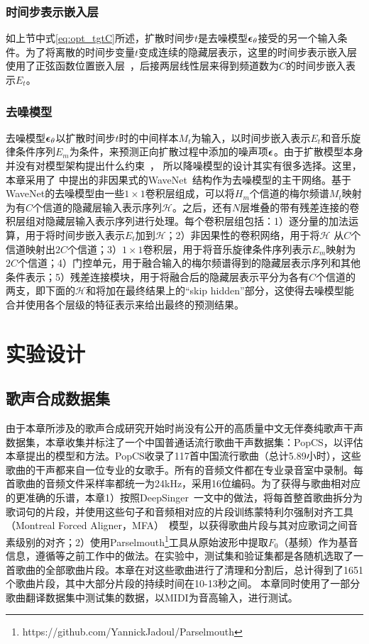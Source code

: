 \subsubsection{时间步表示嵌入层}
如上节中式\eqref{eq:opt_tgtC}所述，扩散时间步$t$是去噪模型${\boldsymbol{\epsilon}}_\theta$接受的另一个输入条件。为了将离散的时间步变量$t$变成连续的隐藏层表示，这里的时间步表示嵌入层使用了正弦函数位置嵌入层~\citep{vaswani2017attention}，后接两层线性层来得到频道数为$C$的时间步嵌入表示$E_t$。
\subsubsection{去噪模型}
去噪模型${\boldsymbol{\epsilon}}_\theta$以扩散时间步$t$时的中间样本$M_t$为输入，以时间步嵌入表示$E_t$和音乐旋律条件序列$E_m$为条件，来预测正向扩散过程中添加的噪声项${\boldsymbol{\epsilon}}$。由于扩散模型本身并没有对模型架构提出什么约束~\citep{sohl2015deep,kong2021diffwave}， 所以降噪模型的设计其实有很多选择。这里，
本章采用了\citet{rethage2018wavenet,kong2021diffwave}
中提出的非因果式的WaveNet~\citep{vanwavenet}结构作为去噪模型的主干网络。基于WaveNet的去噪模型由一些$1\times1$卷积层组成，可以将$H_m$个信道的梅尔频谱$M_t$映射为有$C$个信道的隐藏层输入表示序列$\mathcal{H}$。之后，还有$N$层堆叠的带有残差连接的卷积层组对隐藏层输入表示序列进行处理。每个卷积层组包括：1）逐分量的加法运算，用于将时间步嵌入表示$E_t$加到$\mathcal{H}$；2）非因果性的卷积网络，用于将$\mathcal{H}$ 从$C$个信道映射出$2C$个信道；3）$1\times1$卷积层，用于将音乐旋律条件序列表示$E_m$映射为$2C$个信道；4）门控单元，用于融合输入的梅尔频谱得到的隐藏层表示序列和其他条件表示；5）残差连接模块，用于将融合后的隐藏层表示平分为各有$C$个信道的两支，即下面的$\mathcal{H}$和将加在最终结果上的``skip hidden''部分，这使得去噪模型能合并使用各个层级的特征表示来给出最终的预测结果。
\section{实验设计}
\subsection{歌声合成数据集}
由于本章所涉及的歌声合成研究开始时尚没有公开的高质量中文无伴奏纯歌声干声数据集，本章收集并标注了一个中国普通话流行歌曲干声数据集：PopCS，以评估本章提出的模型和方法。PopCS收录了117首中国流行歌曲（总计5.89小时），这些歌曲的干声都来自一位专业的女歌手。所有的音频文件都在专业录音室中录制。每首歌曲的音频文件采样率都统一为24kHz，采用16位编码。为了获得与歌曲相对应的更准确的乐谱，本章1）按照DeepSinger~\citep{ren2020deepsinger}一文中的做法，将每首整首歌曲拆分为歌词句的片段，并使用这些句子和音频相对应的片段训练蒙特利尔强制对齐工具（Montreal Forced Aligner，MFA）~\citep{mcauliffe2017montreal}模型，以获得歌曲片段与其对应歌词之间音素级别的对齐；2）使用Parselmouth\footnote{https://github.com/YannickJadoul/Parselmouth}工具从原始波形中提取$F_0$（基频）作为基音信息，遵循\citet{wu2020adversarially,blaauw2020sequence,ren2020deepsinger}等之前工作中的做法。在实验中，测试集和验证集都是各随机选取了一首歌曲的全部歌曲片段。本章在对这些歌曲进行了清理和分割后，总计得到了1651个歌曲片段，其中大部分片段的持续时间在10-13秒之间。
本章同时使用了一部分歌曲翻译数据集中测试集的数据，以MIDI为音高输入，进行测试。
